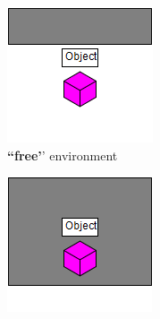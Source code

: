 \documentclass[conference]{IEEEtran}
\begin{document}
\begin{figure}[t]
      \centering
      \begin{subfigure}[t]{0.15\textwidth}
        \includegraphics[width=\textwidth]{images/free.png}
        \caption{\textbf{``free'}' environment}
    \end{subfigure}
    \begin{subfigure}[t]{0.15\textwidth}
        \includegraphics[width=\textwidth]{images/ledge.png}

\end{subfigure}
\end{figure}
\end{document}
